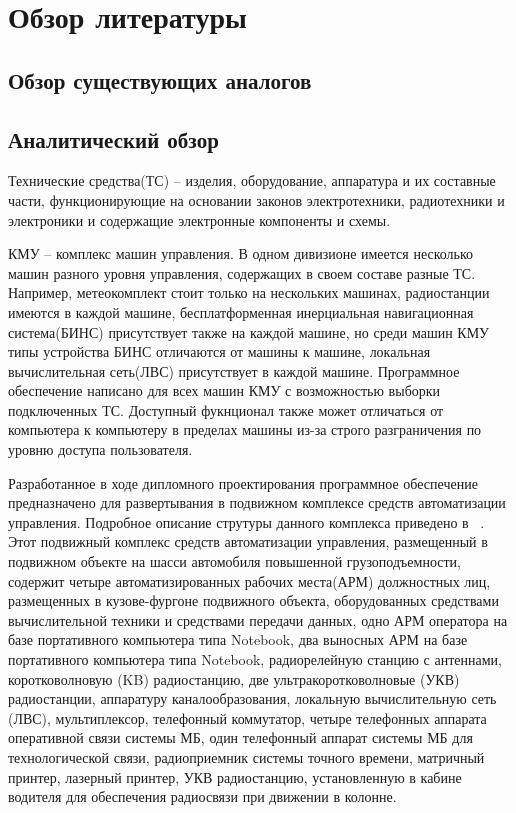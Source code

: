 \section{Обзор литературы}
\label{sec:lit_review}

\subsection{Обзор существующих аналогов}
\label{sub:lit_review:analogues}

\subsection{Аналитический обзор}
\label{sub:lit_review:analitics}
Технические средства(ТС) --  изделия, оборудование, аппаратура и их составные части, функционирующие на основании законов электротехники, радиотехники и электроники и содержащие электронные компоненты и схемы.

КМУ -- комплекс машин управления.
В одном дивизионе имеется несколько машин разного уровня управления, содержащих в своем составе разные ТС.
Например, метеокомплект стоит только на нескольких машинах, радиостанции имеются в каждой машине, бесплатформенная инерциальная навигационная система(БИНС) присутствует также на каждой машине, но среди машин КМУ типы устройства БИНС отличаются от машины к машине, локальная вычислительная сеть(ЛВС) присутствует в каждой машине.
Программное обеспечение написано для всех машин КМУ с возможностью выборки подключенных ТС.
Доступный фукнционал также может отличаться от компьютера к компьютеру в пределах машины из-за строго разграничения по уровню доступа пользователя.

Разработанное в ходе дипломного проектирования программное обеспечение предназначено для развертывания в подвижном комплексе средств автоматизации управления.
Подробное описание струтуры данного комплекса приведено в ~\cite{patent_2263960}.
Этот подвижный комплекс средств автоматизации управления, размещенный в подвижном объекте на шасси автомобиля повышенной грузоподъемности, содержит четыре автоматизированных рабочих места(АРМ) должностных лиц, размещенных в кузове-фургоне подвижного объекта, оборудованных средствами вычислительной техники и средствами передачи данных, одно АРМ оператора на базе портативного компьютера типа Notebook, два выносных АРМ на базе портативного компьютера типа Notebook, радиорелейную станцию с антеннами, коротковолновую (KB) радиостанцию, две ультракоротковолновые (УКВ) радиостанции, аппаратуру каналообразования, локальную вычислительную сеть (ЛВС), мультиплексор, телефонный коммутатор, четыре телефонных аппарата оперативной связи системы МБ, один телефонный аппарат системы МБ для технологической связи, радиоприемник системы точного времени, матричный принтер, лазерный принтер, УКВ радиостанцию, установленную в кабине водителя для обеспечения радиосвязи при движении в колонне.

